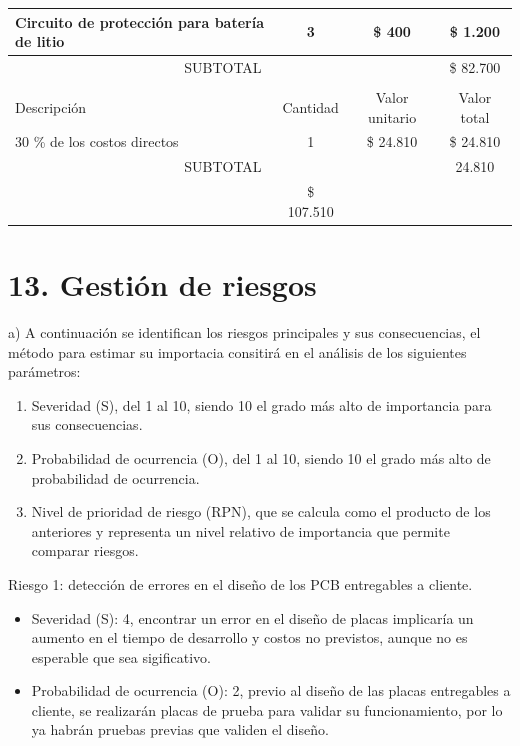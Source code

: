 \documentclass[
11pt, %
codirector, %
]{charter}
\begin{document}
\begin{table}[htpb]
\begin{tabularx}{\linewidth}{@{}|X|c|r|r|@{}}
Circuito de protección para batería de litio &
  \multicolumn{1}{c|}{3} &
  \multicolumn{1}{c|}{\$ 400} &
  \multicolumn{1}{c|}{\$ 1.200} \\ \hline

\multicolumn{3}{|c|}{SUBTOTAL} &
  \multicolumn{1}{c|}{\$ 82.700} \\ \hline
\rowcolor[HTML]{C0C0C0} 
\multicolumn{4}{|c|}{\cellcolor[HTML]{C0C0C0}COSTOS INDIRECTOS} \\ \hline
\rowcolor[HTML]{C0C0C0} 
Descripción &
  \multicolumn{1}{c|}{\cellcolor[HTML]{C0C0C0}Cantidad} &
  \multicolumn{1}{c|}{\cellcolor[HTML]{C0C0C0}Valor unitario} &
  \multicolumn{1}{c|}{\cellcolor[HTML]{C0C0C0}Valor total} \\ \hline
   
   30 \% de los costos directos   &
  \multicolumn{1}{c|}{1} &
  \multicolumn{1}{c|}{\$ 24.810} &
  \multicolumn{1}{c|}{\$ 24.810} \\ \hline

\multicolumn{3}{|c|}{SUBTOTAL} &
  \multicolumn{1}{c|}{24.810} \\ \hline
\rowcolor[HTML]{C0C0C0}
\multicolumn{3}{|c|}{TOTAL} & \$ 107.510
   \\ \hline
\end{tabularx}%
\end{table}


\section{13. Gestión de riesgos}
\label{sec:riesgos}


a) A continuación se identifican los riesgos principales y sus consecuencias, el método para estimar su importacia consitirá en el análisis de los siguientes parámetros:

\begin{enumerate}
\item Severidad (S), del 1 al 10, siendo 10 el grado más alto de importancia para sus consecuencias.
\item Probabilidad de ocurrencia (O), del 1 al 10, siendo 10 el grado más alto de probabilidad de ocurrencia.
\item Nivel de prioridad de riesgo (RPN), que se calcula como el producto de los anteriores y representa un nivel relativo de importancia que permite comparar riesgos.
\end{enumerate}


Riesgo 1: detección de errores en el diseño de los PCB entregables a cliente.
\begin{itemize}
	\item Severidad (S): 4, encontrar un error en el diseño de placas implicaría un aumento en el tiempo de desarrollo y costos no previstos, aunque no es esperable que sea sigificativo.
	\item Probabilidad de ocurrencia (O): 2, previo al diseño de las placas entregables a cliente, se realizarán placas de prueba para validar su funcionamiento, por lo ya habrán pruebas previas que validen el diseño.
\end{itemize}   
\end{document}

